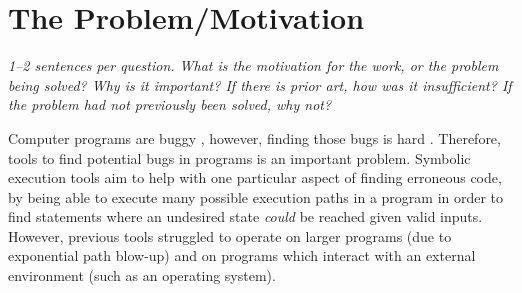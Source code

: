 \documentclass[11pt]{article}
\begin{document}
\begin{itemize}






\end{itemize}

\section*{The Problem/Motivation}

\textsl{1--2 sentences per question. What is the motivation for the work, or
the problem being solved? Why is it important? If there is prior art, how was
it insufficient? If the problem had not previously been solved, why not?}

Computer programs are buggy \cite{GitHubBugs}, however, finding those bugs is
hard \cite{FindingBugsHard}. Therefore, tools to find potential bugs in
programs is an important problem. Symbolic execution tools aim to help with one
particular aspect of finding erroneous code, by being able to execute many
possible execution paths in a program in order to find statements where an
undesired state \textit{could} be reached given valid inputs. However, previous
tools struggled to operate on larger programs (due to exponential path blow-up)
and on programs which interact with an external environment (such as an
operating system).
\end{document}
